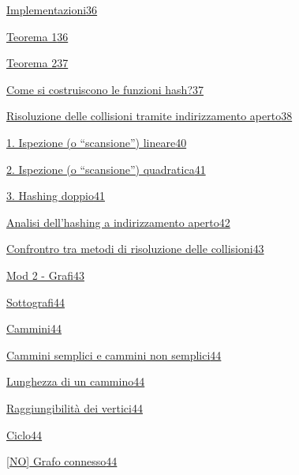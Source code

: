 \documentclass{article}
\begin{document}
{\protect\hyperlink{h.lhp1y3nzdu6x}{Implementazioni}}{\protect\hyperlink{h.lhp1y3nzdu6x}{36}}

{\protect\hyperlink{h.coagge9vpuqt}{Teorema 1}}{\protect\hyperlink{h.coagge9vpuqt}{36}}

{\protect\hyperlink{h.u0cyuvvucft2}{Teorema 2}}{\protect\hyperlink{h.u0cyuvvucft2}{37}}

{\protect\hyperlink{h.9kljpwmnt7yd}{Come si costruiscono le funzioni hash?}}{\protect\hyperlink{h.9kljpwmnt7yd}{37}}

{\protect\hyperlink{h.3fhh68cy94hw}{Risoluzione delle collisioni tramite indirizzamento aperto}}{\protect\hyperlink{h.3fhh68cy94hw}{38}}

{\protect\hyperlink{h.i6sv1bn6gjla}{1. Ispezione (o ``scansione'') lineare}}{\protect\hyperlink{h.i6sv1bn6gjla}{40}}

{\protect\hyperlink{h.83xwipol2nwy}{2. Ispezione (o ``scansione'') quadratica}}{\protect\hyperlink{h.83xwipol2nwy}{41}}

{\protect\hyperlink{h.8kg9yyirra9i}{3. Hashing doppio}}{\protect\hyperlink{h.8kg9yyirra9i}{41}}

{\protect\hyperlink{h.wkyvylqq2lrt}{Analisi dell'hashing a indirizzamento aperto}}{\protect\hyperlink{h.wkyvylqq2lrt}{42}}

{\protect\hyperlink{h.sg1b57l388xe}{Confrontro tra metodi di risoluzione delle collisioni}}{\protect\hyperlink{h.sg1b57l388xe}{43}}

{\protect\hyperlink{h.fi9e3nt34nfb}{Mod 2 - Grafi}}{\protect\hyperlink{h.fi9e3nt34nfb}{43}}

{\protect\hyperlink{h.5gj1hs8i1ooy}{Sottografi}}{\protect\hyperlink{h.5gj1hs8i1ooy}{44}}

{\protect\hyperlink{h.lxvflhr4q9d8}{Cammini}}{\protect\hyperlink{h.lxvflhr4q9d8}{44}}

{\protect\hyperlink{h.sjz08mn040is}{Cammini semplici e cammini non semplici}}{\protect\hyperlink{h.sjz08mn040is}{44}}

{\protect\hyperlink{h.e18ltelmo48z}{Lunghezza di un cammino}}{\protect\hyperlink{h.e18ltelmo48z}{44}}

{\protect\hyperlink{h.4bm9pdnjdb2q}{Raggiungibilità dei vertici}}{\protect\hyperlink{h.4bm9pdnjdb2q}{44}}

{\protect\hyperlink{h.4fm287mz4am5}{Ciclo}}{\protect\hyperlink{h.4fm287mz4am5}{44}}

{\protect\hyperlink{h.rpdf8j1vq7g0}{{[}NO{]} Grafo connesso}}{\protect\hyperlink{h.rpdf8j1vq7g0}{44}}
\end{document}
